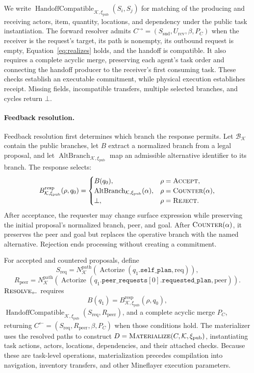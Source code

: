 \documentclass[sigconf,nonacm,balance=false]{aamas}
\begin{document}
We write $\operatorname{HandoffCompatible}_{\mathcal K,\xi_{\mathrm{pub}}}\allowbreak(S_i,S_j)$ for matching of the producing and receiving actors, item, quantity, locations, and dependency under the public task instantiation. The forward resolver admits $C^{\rightarrow}=(S_{\mathrm{snd}},U_{\mathrm{rcv}},\beta,P_C)$ when the receiver is the request's target, its  path is nonempty, its outbound request is empty, Equation~\ref{eq:realizes} holds, and the handoff is compatible. It also requires a complete acyclic merge, preserving each agent's task order and connecting the handoff producer to the receiver's first consuming task. These checks establish an executable commitment, while physical execution establishes receipt. Missing fields, incompatible transfers, multiple selected branches, and cycles return $\bot$.

\paragraph{Feedback resolution.}
Feedback resolution first determines which branch the response permits. Let $\mathcal B_{\mathcal K}$ contain the public branches, let $B$ extract a normalized branch from a legal proposal, and let $\operatorname{AltBranch}_{\mathcal K,\xi_{\mathrm{pub}}}$ map an admissible alternative identifier to its branch. The response selects:
\[
B_{\mathcal K,\xi_{\mathrm{pub}}}^{\mathrm{resp}}(\rho,q_0)=
\begin{cases}
B(q_0), & \rho=\textsc{Accept},\\
\operatorname{AltBranch}_{\mathcal K,\xi_{\mathrm{pub}}}(\alpha), & \rho=\textsc{Counter}(\alpha),\\
\bot, & \rho=\textsc{Reject}.
\end{cases}
\]
After acceptance, the requester may change surface expression while preserving the initial proposal's normalized branch, peer, and goal. After $\textsc{Counter}(\alpha)$, it preserves the peer and goal but replaces the operative branch with the named alternative. Rejection ends processing without creating a commitment.

For accepted and countered proposals, define
\[
S_{\mathrm{req}}=N_{\mathcal K}^{\mathrm{path}}\!\left(\operatorname{Actorize}(q_1.\mathtt{self\_plan},\mathrm{req})\right),
\]
\[
R_{\mathrm{peer}}=N_{\mathcal K}^{\mathrm{path}}\!\left(\operatorname{Actorize}(q_1.\mathtt{peer\_requests}[0].\mathtt{requested\_plan},\mathrm{peer})\right).
\]
$\textsc{Resolve}_{\leftarrow}$ requires
\[
B(q_1)=B_{\mathcal K,\xi_{\mathrm{pub}}}^{\mathrm{resp}}(\rho,q_0),
\]
$\operatorname{HandoffCompatible}_{\mathcal K,\xi_{\mathrm{pub}}}(S_{\mathrm{req}},R_{\mathrm{peer}})$, and a complete acyclic merge $P_C$, returning $C^{\leftarrow}=(S_{\mathrm{req}},R_{\mathrm{peer}},\beta,P_C)$ when those conditions hold.
The materializer uses the resolved paths to construct $D=\textsc{Materialize}(C,\mathcal K,\xi_{\mathrm{pub}})$, instantiating task actions, actors, locations, dependencies, and their attached checks. Because these are task-level operations, materialization precedes compilation into navigation, inventory transfers, and other Mineflayer execution parameters.
\end{document}
